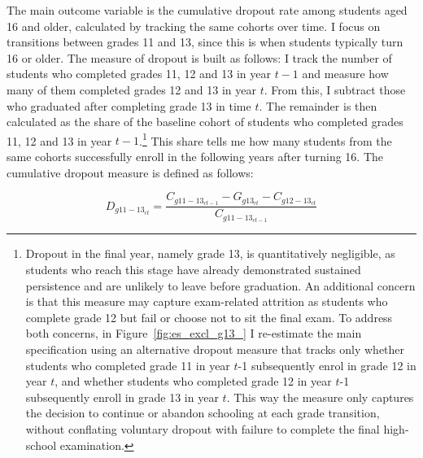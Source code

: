\documentclass[12pt]{article}
\theoremstyle{plain}
\theoremstyle{plain}
\theoremstyle{plain}
\theoremstyle{definition}
\theoremstyle{plain}
\theoremstyle{definition}
\theoremstyle{plain}
\theoremstyle{remark}
\theoremstyle{definition}
\theoremstyle{definition}
\theoremstyle{plain}
\begin{document}
The main outcome variable is the cumulative dropout rate among students aged 16 and older, calculated by tracking the same cohorts over time. I focus on transitions between grades 11 and 13, since this is when students typically turn 16 or older. The measure of dropout is built as follows: I track the number of students who completed grades 11, 12 and 13 in year $t-1$ and measure how many of them completed grades 12 and 13 in year $t$. From this, I subtract those who graduated after completing grade 13 in time $t$. The remainder is then calculated as the share of the baseline cohort of students who completed grades 11, 12 and 13 in year $t-1$.\footnote{Dropout in the final year, namely grade 13, is quantitatively negligible, as students who reach this stage have already demonstrated sustained persistence and are unlikely to leave before graduation. An additional concern is that this measure may capture exam-related attrition as students who complete grade 12 but fail or choose not to sit the final exam. To address both concerns, in Figure~\ref{fig:es_excl_g13_} I re-estimate the main specification using an alternative dropout measure that tracks only whether students who completed grade 11 in year $t$-1 subsequently enrol in grade 12 in year $t$, and whether students who completed grade 12 in year $t$-1 subsequently enroll in grade 13 in year $t$. This way the measure only captures the decision to continue or abandon schooling at each grade transition, without conflating voluntary dropout with failure to complete the final high-school examination.} This share tells me how many students from the same cohorts successfully enroll in the following years after turning 16. The cumulative dropout measure is defined as follows:
\par
\vspace{0.3cm}
\begin{equation}
D_{g11-13{_{ct}}} = \frac{C_{g11-13_{ct-1}} - G_{g13_{ct}} - C_{g12-13_{ct}}}{C_{g11-13_{ct-1}}}
\end{equation}
\vspace{0.3cm}
\end{document}
